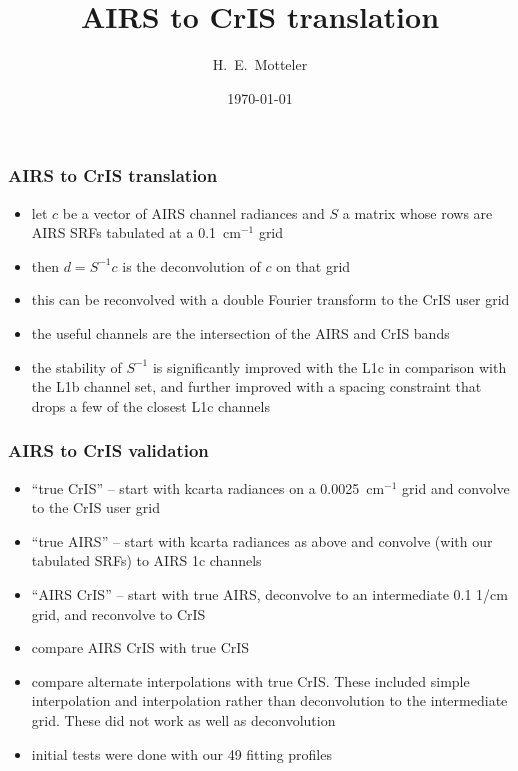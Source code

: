 \documentclass[11pt]{beamer}
\title{AIRS to CrIS translation}
\author{H.~E.~Motteler}
\institute{
  UMBC Atmospheric Spectroscopy Lab \\
  Joint Center for Earth Systems Technology \\
}
\date{\today}
\begin{document}
\begin{frame}[plain]
\titlepage
\end{frame}
\begin{frame}
\frametitle{AIRS to CrIS translation}

\begin{itemize}
  \item let $c$ be a vector of AIRS channel radiances and $S$ a
    matrix whose rows are AIRS SRFs tabulated at a 0.1~cm$^{-1}$
    grid

  \item then $d = S^{-1}c$ is the deconvolution of $c$ on that grid

  \item this can be reconvolved with a double Fourier transform
    to the CrIS user grid

  \item the useful channels are the intersection of the AIRS and
    CrIS bands

  \item the stability of $S^{-1}$ is significantly improved with the
    L1c in comparison with the L1b channel set, and further improved
    with a spacing constraint that drops a few of the closest L1c
    channels

\end{itemize}

\end{frame}
\begin{frame}
\frametitle{AIRS to CrIS validation}

\begin{itemize}
  \item ``true CrIS'' -- start with kcarta radiances on a
    0.0025~cm$^{-1}$ grid and convolve to the CrIS user grid

  \item ``true AIRS'' -- start with kcarta radiances as above and
    convolve (with our tabulated SRFs) to AIRS 1c channels

  \item ``AIRS CrIS'' -- start with true AIRS, deconvolve to an
    intermediate 0.1 1/cm grid, and reconvolve to CrIS
    
  \item compare AIRS CrIS with true CrIS

  \item compare alternate interpolations with true CrIS.  These
    included simple interpolation and interpolation rather than
    deconvolution to the intermediate grid.  These did not work as
    well as deconvolution

  \item initial tests were done with our 49 fitting profiles

\end{itemize}

\end{frame}
\end{document}
